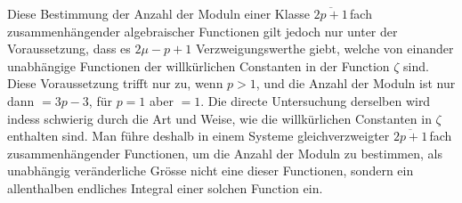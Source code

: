 \documentclass[a4paper,12pt,leqno]{article}
\begin{document}
Diese Bestimmung der Anzahl der Moduln einer Klasse
$\overline{2p + 1} \,$\-fach zusammenh\"{a}ngender algebraischer Functionen
gilt jedoch nur unter der Voraussetzung, dass es $2\mu - p + 1$
Verzweigungswerthe giebt, welche von einander unabh\"{a}ngige
Functionen der willk\"{u}rlichen Constanten in der Function
$\zeta$ sind.  Diese Voraussetzung trifft nur zu, wenn $p > 1$,
und die Anzahl der Moduln ist nur dann $= 3p - 3$, f\"{u}r
$p = 1$ aber $= 1$.  Die directe Untersuchung derselben wird
indess schwierig durch die Art und Weise, wie die
willk\"{u}rlichen Constanten in $\zeta$ enthalten sind.  Man
f\"{u}hre deshalb in einem Systeme gleichverzweigter
$\overline{2p + 1} \,$\-fach zusammenh\"{a}ngender Functionen, um die
Anzahl der Moduln zu bestimmen, als unabh\"{a}ngig
ver\"{a}nderliche Gr\"{o}sse nicht eine dieser Functionen,
sondern ein allenthalben endliches Integral einer solchen
Function ein.
\end{document}

